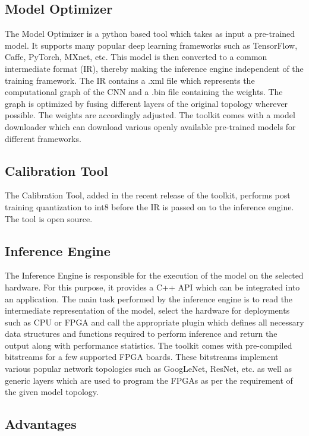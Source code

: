 \documentclass[titlepage]{report}
\begin{document}
\subsection{Model Optimizer}
The Model Optimizer is a python based tool which takes as input a pre-trained model. It supports many popular deep learning frameworks such as TensorFlow, Caffe, PyTorch, MXnet, etc. This model is then converted to a common intermediate format (IR), thereby making the inference engine independent of the training framework. The IR contains a .xml file which represents the computational graph of the CNN and a .bin file containing the weights. The graph is optimized by fusing different layers of the original topology wherever possible. The weights are accordingly adjusted. The toolkit comes with a model downloader which can download various openly available pre-trained models for different frameworks.
 
\subsection{Calibration Tool}
The Calibration Tool, added in the recent release of the toolkit, performs post training quantization to int8 before the IR is passed on to the inference engine. The tool is open source. 
 
 \subsection{Inference Engine}
 The Inference Engine is responsible for the execution of the model on the selected hardware. For this purpose, it provides a C++ API which can be integrated into an application. The main task performed by the inference engine is to read the intermediate representation of the model, select the hardware for deployments such as CPU or FPGA and call the appropriate plugin which defines all necessary data structures and functions required to perform inference and return the output along with performance statistics. 
 The toolkit comes with pre-compiled bitstreams for a few supported FPGA boards. These bitstreams implement various popular network topologies such as GoogLeNet, ResNet, etc. as well as generic layers which are used to program the FPGAs as per the requirement of the given model topology.
 
 \subsection{Advantages}
  
\end{document}
